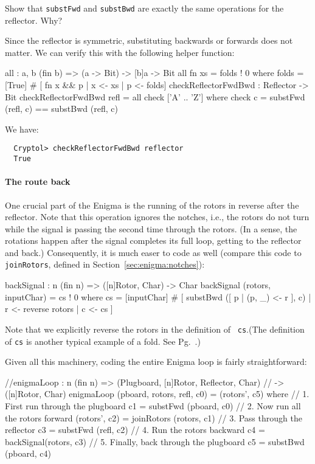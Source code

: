 \begin{Exercise}\label{ex:enigma:8}
  Show that {\tt substFwd} and {\tt substBwd} are exactly the same
  operations for the reflector. Why?
\end{Exercise}
\begin{Answer}
  Since the reflector is symmetric, substituting backwards or forwards
  does not matter. We can verify this with the following helper
  function:\indAll
\begin{code}
  all : {a, b} (fin b) => (a -> Bit) -> [b]a -> Bit
  all fn xs = folds ! 0 where
    folds = [True] # [ fn x && p | x <- xs
                                 | p <- folds]
  checkReflectorFwdBwd : Reflector -> Bit
  checkReflectorFwdBwd refl = all check ['A' .. 'Z']
    where check c = substFwd (refl, c) == substBwd (refl, c)
\end{code}
We have:
\begin{Verbatim}
  Cryptol> checkReflectorFwdBwd reflector
  True
\end{Verbatim}
\end{Answer}

\paragraph*{The route back} One crucial part of the Enigma is the
running of the rotors in reverse after the reflector. Note that this
operation ignores the notches, i.e., the rotors do not turn while the
signal is passing the second time through the rotors. (In a sense, the
rotations happen after the signal completes its full loop, getting to
the reflector and back.)  Consequently, it is much easer to code as
well (compare this code to {\tt joinRotors}, defined in
Section~\ref{sec:enigma:notches}):

\begin{code}
  backSignal : {n} (fin n) => ([n]Rotor, Char) -> Char
  backSignal (rotors, inputChar) = cs ! 0
    where 
      cs = [inputChar] # [  substBwd ([ p | (p, _) <- r ], c)
                          | r <- reverse rotors
                          | c <- cs
                         ]
\end{code}
Note that we explicitly reverse the rotors in the definition of {\tt
  cs}.\indReverse (The definition of {\tt cs} is another typical
example of a fold. See Pg.~\pageref{par:fold}.)\indFold

Given all this machinery, coding the entire Enigma loop is fairly
straightforward:
\begin{code}
  //enigmaLoop : {n} (fin n) => (Plugboard, [n]Rotor, Reflector, Char)
  //                         -> ([n]Rotor, Char)
  enigmaLoop (pboard, rotors, refl, c0) = (rotors', c5)
    where
      // 1. First run through the plugboard
      c1 = substFwd (pboard, c0)
      // 2. Now run all the rotors forward
      (rotors', c2) = joinRotors (rotors, c1)
      // 3. Pass through the reflector
      c3 = substFwd (refl, c2)
      // 4. Run the rotors backward
      c4 = backSignal(rotors, c3)
      // 5. Finally, back through the plugboard
      c5 = substBwd (pboard, c4)
\end{code}

